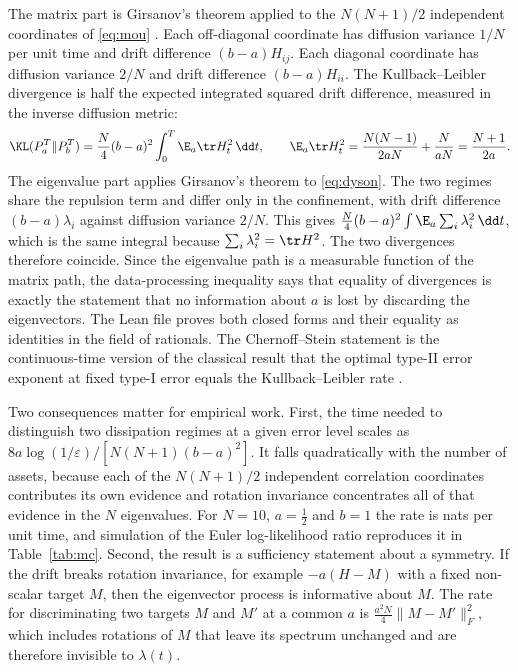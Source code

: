 The matrix part is Girsanov's theorem applied to the $N(N+1)/2$ independent coordinates of \eqref{eq:mou} \citep{girsanov1960transforming}. Each off-diagonal coordinate has diffusion variance $1/N$ per unit time and drift difference $(b-a)H_{ij}$. Each diagonal coordinate has diffusion variance $2/N$ and drift difference $(b-a)H_{ii}$. The Kullback--Leibler divergence is half the expected integrated squared drift difference, measured in the inverse diffusion metric:
\[
 \KL(P_a^T\|P_b^T)=\frac N4(b-a)^2\int_0^T\E_a\tr H_t^2\,\dd t,\qquad
 \E_a\tr H_t^2=\frac{N(N-1)}{2aN}+\frac N{aN}=\frac{N+1}{2a}.
\]
The eigenvalue part applies Girsanov's theorem to \eqref{eq:dyson}. The two regimes share the repulsion term and differ only in the confinement, with drift difference $(b-a)\lambda_i$ against diffusion variance $2/N$. This gives $\tfrac N4(b-a)^2\int\E_a\sum_i\lambda_i^2\,\dd t$, which is the same integral because $\sum_i\lambda_i^2=\tr H^2$. The two divergences therefore coincide. Since the eigenvalue path is a measurable function of the matrix path, the data-processing inequality says that equality of divergences is exactly the statement that no information about $a$ is lost by discarding the eigenvectors. The Lean file proves both closed forms and their equality as identities in the field of rationals. The Chernoff--Stein statement is the continuous-time version of the classical result that the optimal type-II error exponent at fixed type-I error equals the Kullback--Leibler rate \citep{chernoff1952measure,cover2006elements}.

Two consequences matter for empirical work. First, the time needed to distinguish two dissipation regimes at a given error level scales as $8a\log(1/\varepsilon)/[N(N+1)(b-a)^2]$. It falls quadratically with the number of assets, because each of the $N(N+1)/2$ independent correlation coordinates contributes its own evidence and rotation invariance concentrates all of that evidence in the $N$ eigenvalues. For $N=10$, $a=\tfrac12$ and $b=1$ the rate is \MOUrate{} nats per unit time, and simulation of the Euler log-likelihood ratio reproduces it in Table~\ref{tab:mc}. Second, the result is a sufficiency statement about a symmetry. If the drift breaks rotation invariance, for example $-a(H-M)$ with a fixed non-scalar target $M$, then the eigenvector process is informative about $M$. The rate for discriminating two targets $M$ and $M'$ at a common $a$ is $\tfrac{a^2N}4\|M-M'\|_F^2$, which includes rotations of $M$ that leave its spectrum unchanged and are therefore invisible to $\lambda(t)$.

